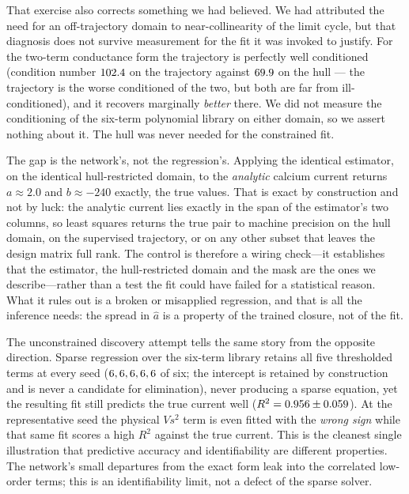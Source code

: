 \documentclass{article}
\newcommand{\gcaMain}{2.0}     %
\newcommand{\bTrue}{-240}      %
\begin{document}
That exercise also corrects something we had believed. We had attributed the need
for an off-trajectory domain to near-collinearity of the limit cycle, but that
diagnosis does not survive measurement for the fit it was invoked to justify. For
the two-term conductance form the
trajectory is perfectly well conditioned (condition number
$102.4$ on the trajectory against $69.9$ on
the hull --- the trajectory is the worse conditioned of the two, but both are far
from ill-conditioned), and it recovers marginally \emph{better} there. We did not measure the conditioning of
the six-term polynomial library on either domain, so we assert nothing about it.
The hull was never needed for the constrained fit.

The gap is the network's, not the regression's. Applying the identical estimator,
on the identical hull-restricted domain, to the \emph{analytic} calcium current
returns $a\approx\gcaMain$ and $b\approx\bTrue$ exactly, the true values. %
That is exact by construction and not by luck: the analytic current lies exactly
in the span of the estimator's two columns, so least squares returns the true
pair to machine precision on the hull domain, on the supervised trajectory, or on
any other subset that leaves the design matrix full rank. The control is
therefore a wiring check---it establishes that the estimator, the hull-restricted
domain and the mask are the ones we describe---rather than a test the fit could
have failed for a statistical reason. What it rules out is a broken or misapplied
regression, and that is all the inference needs: the spread in $\hat a$ is a
property of the trained closure, not of the fit.

The unconstrained discovery attempt tells the same story from the opposite
direction. Sparse regression over the six-term library retains all five
thresholded terms at every seed ($6, 6, 6, 6, 6$ of six; the intercept
is retained by construction and is never a candidate for elimination), never
producing a sparse equation, yet
the resulting fit still predicts the true current well
($R^2 = 0.956 \pm 0.059$). At the representative seed the
physical $Vs^2$ term is even fitted with the \emph{wrong sign} while that same fit
scores a high $R^2$ against the true current. This is the cleanest single
illustration that predictive accuracy and identifiability are different properties. The
network's small departures from the exact form leak into the correlated low-order
terms; this is an identifiability limit, not a defect of the sparse solver.
\end{document}
